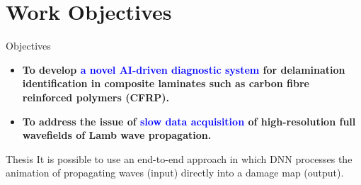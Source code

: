 \documentclass[10pt,aspectratio=169]{beamer} %
\begin{document}
\section{Work Objectives}
\begin{frame}{Objectives}
	\begin{itemize}
		\item \textbf{To develop \textcolor{blue}{a novel AI-driven diagnostic system} for delamination identification in composite laminates such as carbon fibre reinforced polymers (CFRP).}
		\item \textbf{To address the issue of \textcolor{blue}{slow data acquisition} of high-resolution full wavefields of Lamb wave propagation.}
	\end{itemize}
	\begin{alertblock}{Thesis}
		It is possible to use an end-to-end approach in which DNN 
		processes the animation of propagating waves (input) directly into a damage map (output).
	\end{alertblock}
\end{frame}
\end{document}
